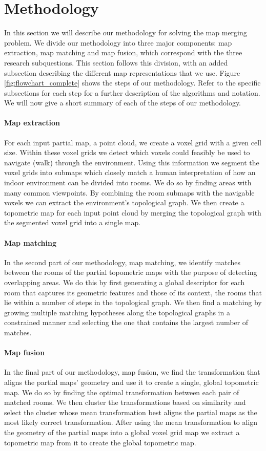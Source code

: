 \section{Methodology}
In this section we will describe our methodology for solving the map merging problem. We divide our methodology into three major components: map extraction, map matching and map fusion, which correspond with the three research subquestions. This section follows this division, with an added subsection describing the different map representations that we use. Figure \ref{fig:flowchart_complete} shows the steps of our methodology. Refer to the specific subsections for each step for a further description of the algorithms and notation. We will now give a short summary of each of the steps of our methodology.

\paragraph{Map extraction}
For each input partial map, a point cloud, we create a voxel grid with a given cell size. Within these voxel grids we detect which voxels could feasibly be used to navigate (walk) through the environment. Using this information we segment the voxel grids into submaps which closely match a human interpretation of how an indoor environment can be divided into rooms. We do so by finding areas with many common viewpoints. By combining the room submaps with the navigable voxels we can extract the environment's topological graph. We then create a topometric map for each input point cloud by merging the topological graph with the segmented voxel grid into a single map.

\paragraph{Map matching}
In the second part of our methodology, map matching, we identify matches between the rooms of the partial topometric maps with the purpose of detecting overlapping areas. We do this by first generating a global descriptor for each room that captures its geometric features and those of its context, the rooms that lie within a number of steps in the topological graph. We then find a matching by growing multiple matching hypotheses along the topological graphs in a constrained manner and selecting the one that contains the largest number of matches.

\paragraph{Map fusion}
In the final part of our methodology, map fusion, we find the transformation that aligns the partial maps' geometry and use it to create a single, global topometric map. We do so by finding the optimal transformation between each pair of matched rooms. We then cluster the transformations based on similarity and select the cluster whose mean transformation best aligns the partial maps as the most likely correct transformation. After using the mean transformation to align the geometry of the partial maps into a global voxel grid map we extract a topometric map from it to create the global topometric map.

